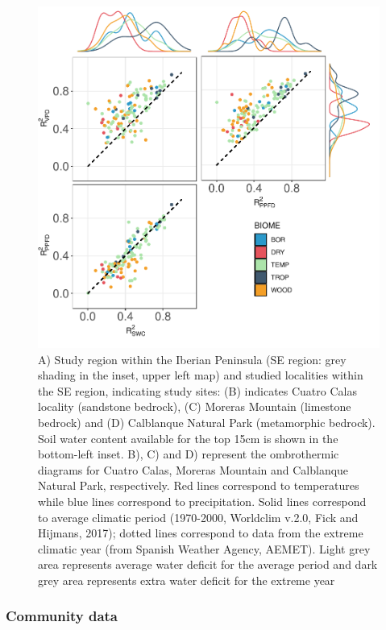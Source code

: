\documentclass[11pt,twoside]{reedthesis}
\begin{document}
\setlength{\abovecaptionskip}{10pt}
\begin{figure}[hbt!]

{\centering \includegraphics[width=1\linewidth]{figure/CH4/figure1} 

}

\caption[Study sites and its ombrothermic diagrams]{A) Study region within the Iberian Peninsula (SE region: grey shading in the inset, upper left map) and studied localities within the SE region, indicating study sites: (B) indicates Cuatro Calas locality (sandstone bedrock), (C) Moreras Mountain (limestone bedrock) and (D) Calblanque Natural Park (metamorphic bedrock). Soil water content available for the top 15cm is shown in the bottom-left inset.  B), C) and D) represent the ombrothermic diagrams for Cuatro Calas, Moreras Mountain and Calblanque Natural Park, respectively. Red lines correspond to temperatures while blue lines correspond to precipitation. Solid lines correspond to average climatic period (1970-2000, Worldclim v.2.0, Fick and Hijmans, 2017); dotted lines correspond to data from the extreme climatic year (from Spanish Weather Agency, AEMET). Light grey area represents average water deficit for the average period and dark grey area represents extra water deficit for the extreme year}\label{fig:Ch4plot1}
\end{figure}
\subsubsection{Community data}\label{community-data}
\end{document}
